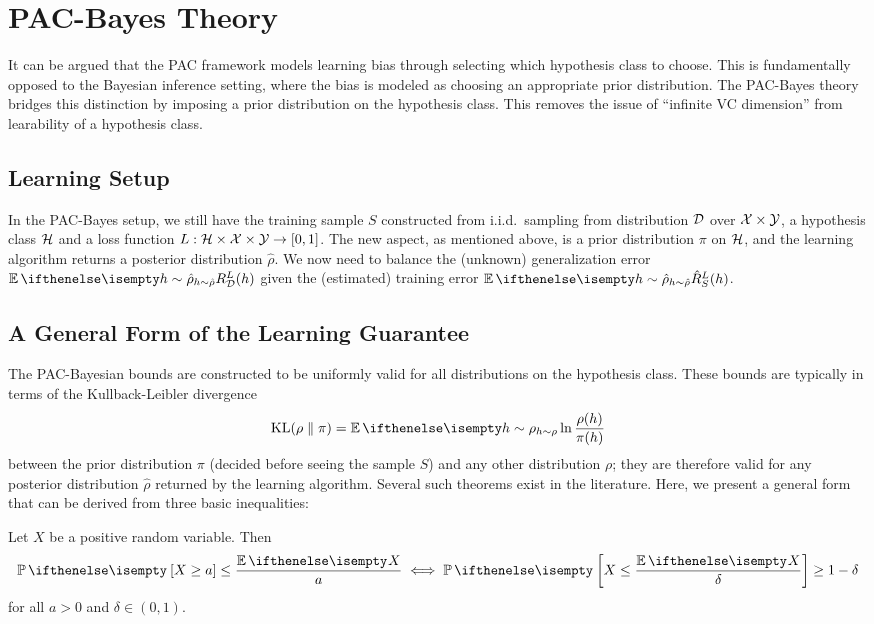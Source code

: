 \section{PAC-Bayes Theory}

It can be argued that the PAC framework models learning bias through selecting
which hypothesis class to choose. This is fundamentally opposed to the Bayesian
inference setting, where the bias is modeled as choosing an appropriate prior
distribution. The PAC-Bayes theory bridges this distinction by imposing a prior
distribution on the hypothesis class. This removes the issue of ``infinite VC
dimension'' from learability of a hypothesis class.

\subsection{Learning Setup}

In the PAC-Bayes setup, we still have the training sample $S$ constructed from
i.i.d.\ sampling from distribution $\mathcal{D}$ over $\mathcal{X} \times \mathcal{Y}$, a hypothesis
class $\mathcal{H}$ and a loss function $L : \mathcal{H} \times \mathcal{X} \times \mathcal{Y} \to [0, 1]$. The
new aspect, as mentioned above, is a prior distribution $\pi$ on $\mathcal{H}$, and the
learning algorithm returns a posterior distribution $\hat{\rho}$. We now need to
balance the (unknown) generalization error $\Ev[h \sim \hat{\rho}]{R_\CD^L(h)}$
given the (estimated) training error $\Ev[h \sim \hat{\rho}]{\hat{R}_S^L(h)}$.

\subsection{A General Form of the Learning Guarantee}

The PAC-Bayesian bounds are constructed to be uniformly valid for all
distributions on the hypothesis class. These bounds are typically in terms of
the Kullback-Leibler divergence
\begin{equation}
  \KL{\rho}{\pi} = \Ev[h \sim \rho]{\ln\frac{\rho(h)}{\pi(h)}}
\end{equation}
between the prior distribution $\pi$ (decided before seeing the sample $S$) and
any other distribution $\rho$; they are therefore valid for any posterior
distribution $\hat{\rho}$ returned by the learning algorithm. Several such
theorems exist in the literature. Here, we present a general form that can be
derived from three basic inequalities:

\begin{lemma}
  Let $X$ be a positive random variable. Then
  \begin{equation}
    \Pr{X \geq a} \leq \frac{\Ev{X}}{a} \iff \Pr{X \leq \frac{\Ev{X}}{\delta}}
    \geq 1 - \delta
  \end{equation}
  for all $a > 0$ and $\delta \in (0, 1)$.
\end{lemma}

